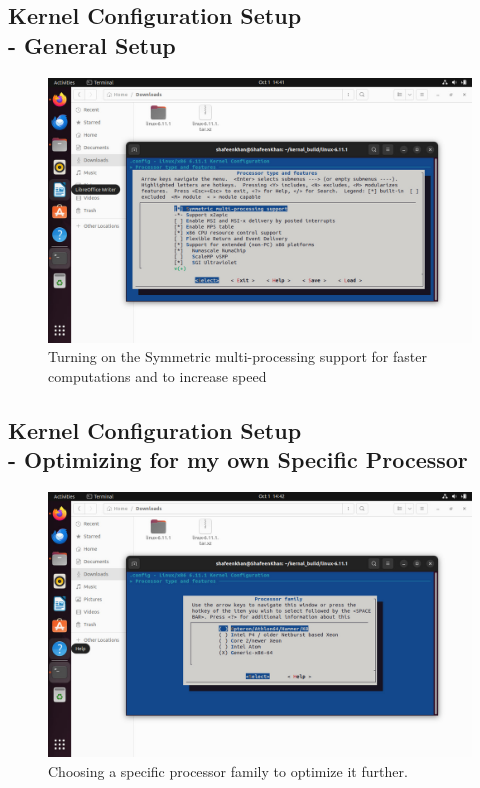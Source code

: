 \documentclass{article}
\begin{document}
\subsection{Kernel Configuration Setup\\ - General Setup}
\begin{figure}[H]
    \centering
    \includegraphics[width=0.8\linewidth]{59.jpg}
    \caption{Turning on the Symmetric multi-processing support for faster computations and to increase speed}
\end{figure}


\subsection{Kernel Configuration Setup\\ -  Optimizing for my own Specific Processor}
\begin{figure}[H]
    \centering
    \includegraphics[width=0.8\linewidth]{58.jpg}
    \caption{Choosing a specific processor family to optimize it further.}
\end{figure}
\end{document}
